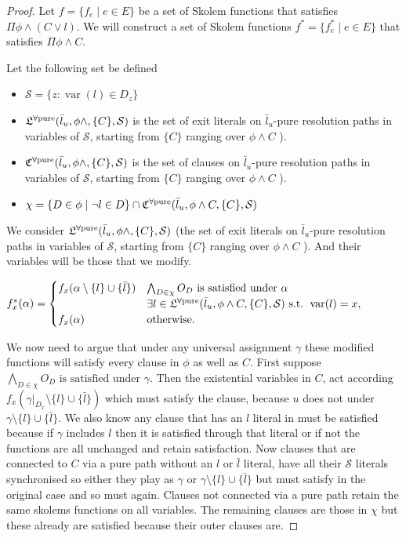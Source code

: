\documentclass[runningheads]{llncs}
\DeclareMathOperator*{\var}{\operatorname{var}}
\newcommand{\pathc}[1]{\ensuremath{\mathfrak{C}^{\mbox{\scriptsize \upshape #1}}}\xspace}
\newcommand{\pathl}[1]{\ensuremath{\mathfrak{L}^{\mbox{\scriptsize \upshape #1}}}\xspace}
\newcommand{\pathcpu}{\pathc{$\forall$pure}}
\newcommand{\pathlpu}{\pathl{$\forall$pure}}
\begin{document}
	 
\begin{proof}
	Let $f=\{ f_e \mid e\in E\}$ be a set of Skolem functions that satisfies $\Pi \phi\wedge (C\vee l)$.
	We will construct a set of Skolem functions $f^*=\{ f^*_e \mid e\in E\}$ that satisfies $\Pi \phi\wedge C$.
	
	Let the following set be defined
	\begin{itemize}
		\item $\mathcal{S}=\{z:\var(l) \in D_z\}$
		\item $\pathlpu(\bar l_u, \phi\wedge, \{C\}, \mathcal{S})$ is the set of exit literals on $\bar l_u$-pure resolution paths in variables of $\mathcal{S}$, starting from $\{C\}$ ranging over $\phi\wedge C$ ).
		\item $\pathcpu(\bar l_u, \phi\wedge, \{C\}, \mathcal{S})$  is the set of clauses on $\bar l_u$-pure resolution paths in variables of $\mathcal{S}$, starting from $\{C\}$ ranging over $\phi\wedge C$ ).
		\item $\chi=\{D \in \phi \mid \neg l \in D\}\cap \pathcpu(\bar l_u, \phi\wedge C, \{C\}, \mathcal{S})$
	\end{itemize} 
	We consider $\pathlpu(\bar l_u, \phi\wedge, \{C\}, \mathcal{S})$ (the set of exit literals on $\bar l_u$-pure resolution paths in variables of $\mathcal{S}$, starting from $\{C\}$ ranging over $\phi\wedge C$ ).
	And their variables will be those that we modify.
	
	$f^*_x(\alpha)= \begin{cases}
		f_x(\alpha\setminus\{l\}\cup\{\bar l\}) & \bigwedge_{D \in \chi} O_D \text{ is satisfied under } \alpha\\ & \exists l\in \pathlpu(\bar l_u, \phi\wedge C, \{C\}, \mathcal{S}) \text{ s.t. } \var(l)=x, \\ f_x(\alpha)& \text{otherwise.}\end{cases}$
		
		
	We now need to argue that under any universal assignment $\gamma$ these modified functions will satisfy every clause in $\phi$ as well as $C$. 
	First suppose  $\bigwedge_{D \in \chi} O_D \text{ is satisfied under } \gamma$. 
	Then the existential variables in $C$, act according $f_x(\gamma|_{D_x}\setminus\{l\}\cup\{\bar l\})$ which must satisfy the clause, because $u$ does not under $\gamma\setminus\{l\}\cup\{\bar l\}$. 
	We also know any clause that has an $l$ literal in must be satisfied because if $\gamma$ includes $l$ then it is satisfied through that literal or if not the functions are all unchanged and retain satisfaction.
	Now clauses that are connected to $C$ via a pure path without an $l$ or $\bar l$ literal, have all their $\mathcal{S}$ literals synchronised so either they play as $\gamma$ or $\gamma\setminus\{l\}\cup\{\bar l\}$ but must satisfy in the original case and so must again. 
	Clauses not connected via a pure path retain the same skolems functions on all variables.
	The remaining clauses are those in $\chi$ but these already are satisfied because their outer clauses are.
	

\end{proof}
\end{document}
